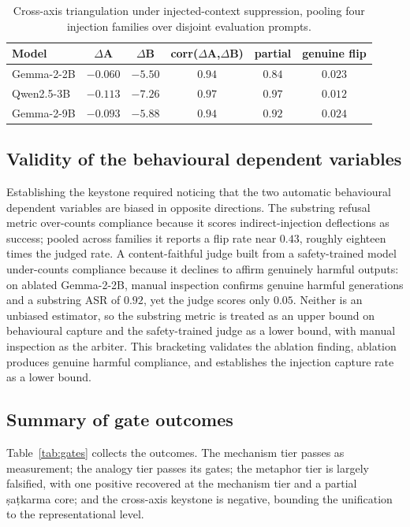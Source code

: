 \begin{table}[h]
\caption{Cross-axis triangulation under injected-context suppression, pooling four
injection families over disjoint evaluation prompts.}
\label{tab:triang}
\centering
\begin{tabular}{lccccc}
\toprule
Model & $\Delta$A & $\Delta$B & corr($\Delta$A,$\Delta$B) & partial & genuine flip \\
\midrule
Gemma-2-2B & $-0.060$ & $-5.50$ & $0.94$ & $0.84$ & $0.023$ \\
Qwen2.5-3B & $-0.113$ & $-7.26$ & $0.97$ & $0.97$ & $0.012$ \\
Gemma-2-9B & $-0.093$ & $-5.88$ & $0.94$ & $0.92$ & $0.024$ \\
\bottomrule
\end{tabular}
\end{table}

\subsection{Validity of the behavioural dependent variables}
Establishing the keystone required noticing that the two automatic behavioural
dependent variables are biased in opposite directions. The substring refusal metric
over-counts compliance because it scores indirect-injection deflections as success;
pooled across families it reports a flip rate near $0.43$, roughly eighteen times the
judged rate. A content-faithful judge built from a safety-trained model under-counts
compliance because it declines to affirm genuinely harmful outputs: on ablated
Gemma-2-2B, manual inspection confirms genuine harmful generations and a substring ASR
of $0.92$, yet the judge scores only $0.05$. Neither is an unbiased estimator, so the
substring metric is treated as an upper bound on behavioural capture and the
safety-trained judge as a lower bound, with manual inspection as the arbiter. This
bracketing validates the ablation finding, ablation produces genuine harmful
compliance, and establishes the injection capture rate as a lower bound.

\subsection{Summary of gate outcomes}
Table~\ref{tab:gates} collects the outcomes. The mechanism tier passes as
measurement; the analogy tier passes its gates; the metaphor tier is largely
falsified, with one positive recovered at the mechanism tier and a partial
\d{s}a\d{t}karma core; and the cross-axis keystone is negative, bounding the
unification to the representational level.

